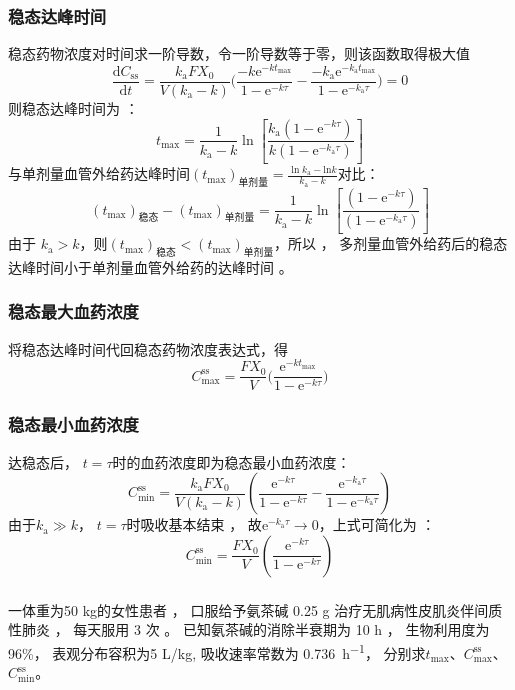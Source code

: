 \documentclass[dvipsnames, svgnames, x11names]{beamer}
\begin{document}
\begin{frame}
	\frametitle{稳态达峰时间}
	稳态药物浓度对时间求一阶导数，令一阶导数等于零，则该函数取得极大值
	\[
		\frac{\mathrm{d}C_\mathrm{ss}}{\mathrm{d}t}=\frac{k_\mathrm{a}FX_0}{V(k_\mathrm{a}-k)}\Bigg(\frac{-k\mathrm{e}^{-kt_\mathrm{max}}}{1-\mathrm{e}^{-k\tau}}-\frac{-k_\mathrm{a}\mathrm{e}^{-k_\mathrm{a}t_\mathrm{max}}}{1-\mathrm{e}^{-k_\mathrm{a}\tau}}\Bigg)=0
	\]
	则稳态达峰时间为 ：
	\[
		t_{\max}=\dfrac{1}{k_\mathrm{a}-k}\ln \left[\dfrac{k_\mathrm{a}(1-\mathrm{e}^{-k\tau})}{k(1-\mathrm{e}^{-k_\mathrm{a}\tau})}\right]
	\]
	与单剂量血管外给药达峰时间$(t_{\mathrm{max}})_\text{单剂量}=\frac{\ln k_{\mathrm{a}}-\mathrm{ln}k}{k_{\mathrm{a}}-k}$对比：
	\[
		(t_{\mathrm{max}})_\text{稳态}-(t_{\mathrm{max}})_\text{单剂量} = \dfrac{1}{k_\mathrm{a}-k}\ln \left[\dfrac{(1-\mathrm{e}^{-k\tau})}{(1-\mathrm{e}^{-k_\mathrm{a}\tau})}\right]
	\]
	由于 $k_\mathrm{a}>k$，则$(t_{\mathrm{max}})_\text{稳态}<(t_{\mathrm{max}})_\text{单剂量}$，所以 ， 多剂量血管外给药后的稳态达峰时间小于单剂量血管外给药的达峰时间 。
\end{frame}


\begin{frame}
	\frametitle{稳态最大血药浓度}
	将稳态达峰时间代回稳态药物浓度表达式，得
	\[
		C_{\max}^{\mathrm{ss}}=\frac{FX_{0}}{V}\Big(\frac{\mathrm{e}^{-kt_{\max}}}{1-\mathrm{e}^{-k\tau}}\Big)
	\]
\end{frame}


\begin{frame}
	\frametitle{稳态最小血药浓度}
	达稳态后， $t=\tau$时的血药浓度即为稳态最小血药浓度：
	\[
		C_{\min}^{\mathrm{ss}} =\frac{k_\mathrm{a}FX_0}{V(k_\mathrm{a}-k)}\left(\frac{\mathrm{e}^{-k\tau}}{1-\mathrm{e}^{-k\tau}}-\frac{\mathrm{e}^{-k_\mathrm{a}\tau}}{1-\mathrm{e}^{-k_\mathrm{a}\tau}}\right)
	\]
	由于$k_{\mathrm{a}}\gg k$， $t=\tau$时吸收基本结束 ， 故$\mathrm{e}^{-k_{\mathrm{a}}\tau} \to 0$，上式可简化为 ：
	\[
		C_{\min}^{\mathrm{ss}} =\frac{FX_0}{V}\left(\frac{\mathrm{e}^{-k\tau}}{1-\mathrm{e}^{-k\tau}}\right)
	\]
\end{frame}


\begin{frame}[t]
	\frametitle{}
	\begin{example}
		一体重为50 kg的女性患者 ， 口服给予氨茶碱 0.25 g 治疗无肌病性皮肌炎伴间质性肺炎 ， 每天服用 3 次 。 已知氨茶碱的消除半衰期为 10 h ， 生物利用度为 96\%， 表观分布容积为5 L/kg, 吸收速率常数为 \SI{0.736}{h^{-1}}， 分别求$t_{\mathrm{max}}$、$C_{\max}^{\mathrm{ss}}$、$C_{\min}^{\mathrm{ss}}$。
	\end{example}
\end{frame}
\end{document}
